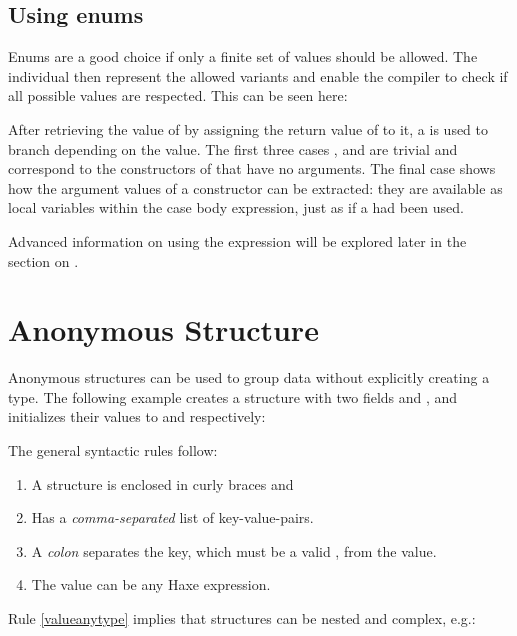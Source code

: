 \subsection{Using enums}
\label{types-enum-using}

Enums are a good choice if only a finite set of values should be allowed. The individual  then represent the allowed variants and enable the compiler to check if all possible values are respected. This can be seen here:


After retrieving the value of  by assigning the return value of  to it, a  is used to branch depending on the value. The first three cases ,  and  are trivial and correspond to the constructors of  that have no arguments. The final case  shows how the argument values of a constructor can be extracted: they are available as local variables within the case body expression, just as if a  had been used.

Advanced information on using the  expression will be explored later in the section on .


\section{Anonymous Structure}
\label{types-anonymous-structure}

Anonymous structures can be used to group data without explicitly creating a type. The following example creates a structure with two fields  and , and initializes their values to  and  respectively:

The general syntactic rules follow:

\begin{enumerate}
	\item A structure is enclosed in curly braces \expr{$\left\{\right\}$} and
	\item Has a \emph{comma-separated} list of key-value-pairs.
	\item A \emph{colon} separates the key, which must be a valid , from the value.
	\item\label{valueanytype} The value can be any Haxe expression.
\end{enumerate}
Rule \ref{valueanytype} implies that structures can be nested and complex, e.g.:

